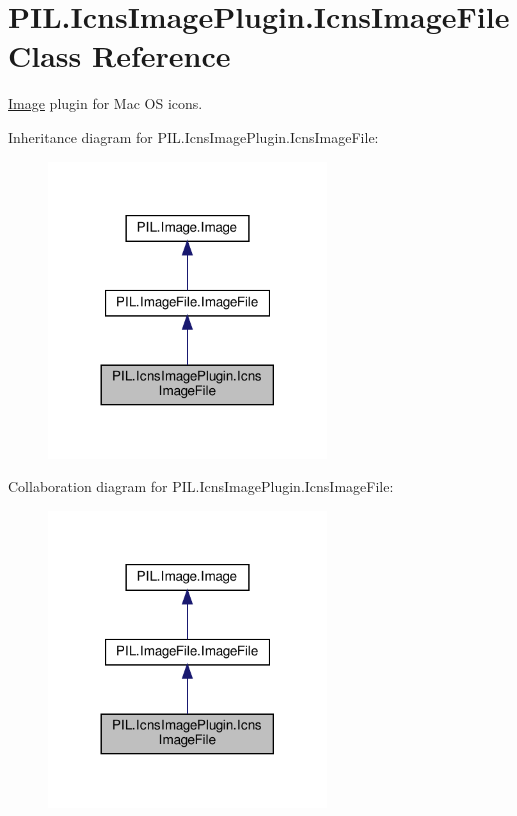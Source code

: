 \hypertarget{classPIL_1_1IcnsImagePlugin_1_1IcnsImageFile}{}\section{P\+I\+L.\+Icns\+Image\+Plugin.\+Icns\+Image\+File Class Reference}
\label{classPIL_1_1IcnsImagePlugin_1_1IcnsImageFile}


\hyperlink{namespacePIL_1_1Image}{Image} plugin for Mac OS icons.  




Inheritance diagram for P\+I\+L.\+Icns\+Image\+Plugin.\+Icns\+Image\+File\+:
\nopagebreak
\begin{figure}[H]
\begin{center}
\leavevmode
\includegraphics[width=209pt]{classPIL_1_1IcnsImagePlugin_1_1IcnsImageFile__inherit__graph}
\end{center}
\end{figure}


Collaboration diagram for P\+I\+L.\+Icns\+Image\+Plugin.\+Icns\+Image\+File\+:
\nopagebreak
\begin{figure}[H]
\begin{center}
\leavevmode
\includegraphics[width=209pt]{classPIL_1_1IcnsImagePlugin_1_1IcnsImageFile__coll__graph}
\end{center}
\end{figure}
